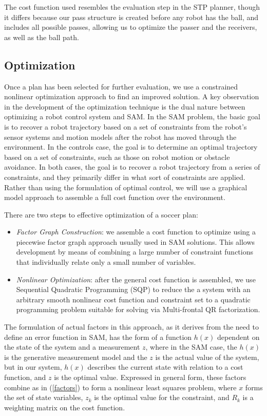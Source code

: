 The cost function used resembles the evaluation step in the STP planner, though it differs because our pass structure is created before any robot has the ball, and includes all possible passes, allowing us to optimize the passer and the receivers, as well as the ball path.

\subsection{Optimization}
Once a plan has been selected for further evaluation, we use a constrained nonlinear optimization approach to find an improved solution.  A key observation in the development of the optimization technique is the dual nature between optimizing a robot control system and SAM.  In the SAM problem, the basic goal is to recover a robot trajectory based on a set of constraints from the robot's sensor systems and motion models after the robot has moved through the environment.  In the controls case, the goal is to determine an optimal trajectory based on a set of constraints, such as those on robot motion or obstacle avoidance.  In both cases, the goal is to recover a robot trajectory from a series of constraints, and they primarily differ in what sort of constraints are applied.  Rather than using the formulation of optimal control, we will use a graphical model approach to assemble a full cost function over the environment.  

There are two steps to effective optimization of a soccer plan:
\begin{itemize}
 \item \textit{Factor Graph Construction}: we assemble a cost function to optimize using a piecewise factor graph approach usually used in SAM solutions.  This allows development by means of combining a large number of constraint functions that individually relate only a small number of variables.
\item \textit{Nonlinear Optimization}: after the general cost function is assembled, we use Sequential Quadratic Programming (SQP) to reduce the a system with an arbitrary smooth nonlinear cost function and constraint set to a quadratic programming problem suitable for solving via Multi-frontal QR factorization.  
 \end{itemize}

The formulation of actual factors in this approach, as it derives from the need to define an error function in SAM, has the form of a function $h(x)$ dependent on the state of the system and a measurement $z$, where in the SAM case, the $h(x)$ is the generative measurement model and the $z$ is the actual value of the system, but in our system, $h(x)$ describes the current state with relation to a cost function, and $z$ is the optimal value.  Expressed in general form, these factors combine as in (\ref{factors}) to form a nonlinear least squares problem, where $x$ forms the set of state variables, $z_{k}$ is the optimal value for the constraint, and $R_{k}$ is a weighting matrix on the cost function.

